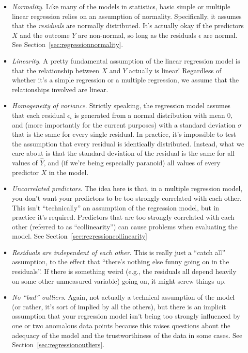 \begin{itemize}
\item {\it Normality}. Like many of the models in statistics, basic simple or multiple linear regression relies on an assumption of normality. Specifically, it assumes that the {\it residuals} are normally distributed. It's actually okay if the predictors $X$ and the outcome $Y$ are non-normal, so long as the residuals $\epsilon$ are normal. See Section~\ref{sec:regressionnormality}.
\item {\it Linearity}. A pretty fundamental assumption of the linear regression model is that the relationship between $X$ and $Y$ actually is linear! Regardless of whether it's a simple regression or a multiple regression, we assume that the relationships involved are linear. 
\item {\it Homogeneity of variance}. Strictly speaking, the regression model assumes that each residual $\epsilon_i$ is generated from a normal distribution with mean 0, and (more importantly for the current purposes) with a standard deviation $\sigma$ that is the same for every single residual. In practice, it's impossible to test the assumption that every residual is identically distributed. Instead, what we care about is that the standard deviation of the residual is the same for all values of $\hat{Y}$, and (if we're being especially paranoid) all values of every predictor $X$ in the model. 
\item {\it Uncorrelated predictors}. The idea here is that, in a multiple regression model, you don't want your predictors to be too strongly correlated with each other. This isn't  ``technically'' an assumption of the regression model, but in practice it's required. Predictors that are too strongly correlated with each other (referred to as ``collinearity'') can cause problems when evaluating the model. See Section~\ref{sec:regressioncollinearity}
\item {\it Residuals are independent of each other}. This is really just a ``catch all'' assumption, to the effect that ``there's nothing else funny going on in the residuals''. If there is something weird (e.g., the residuals all depend heavily on some other unmeasured variable) going on, it might screw things up.
\item {\it No ``bad'' outliers}. Again, not actually a technical assumption of the model (or rather, it's sort of implied by all the others), but there is an implicit assumption that your regression model isn't being too strongly influenced by one or two anomalous data points because this raises questions about the adequacy of the model and the trustworthiness of the data in some cases. See Section~\ref{sec:regressionoutliers}.
\end{itemize}

